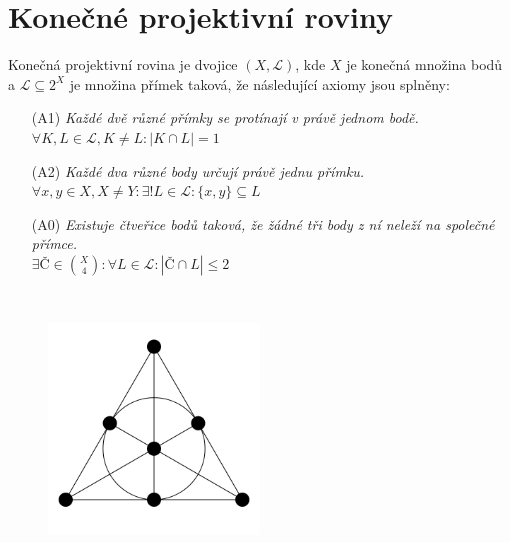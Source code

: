 \section{Konečné projektivní roviny}
\begin{t_definition}
  Konečná projektivní rovina je dvojice $(X, \mathcal{L})$, kde $X$ je konečná množina bodů a $\mathcal{L}\subseteq 2^X$ je množina přímek taková, že následující axiomy jsou splněny:
  \begin{enumerate}
    \item[(A1)]
    \textit{Každé dvě různé přímky se protínají v právě jednom bodě.}
    \\$\forall K,L\in\mathcal{L},K\neq L : |K\cap L|=1$
    \item[(A2)]
    \textit{Každé dva různé body určují právě jednu přímku.}
    \\$\forall x,y\in X,X\neq Y : \exists! L\in\mathcal{L} : \{x, y\}\subseteq L$
    \item[(A0)]
    \textit{Existuje čtveřice bodů taková, že žádné tři body z ní neleží na společné přímce.}
    \\$\exists Č\in\binom{X}{4}:\forall L\in\mathcal{L}:|Č\cap L|\leq 2$
  \end{enumerate}
\end{t_definition}

\begin{t_example}$ $
  \begin{figure}[!htbp]
    \centering
    \includegraphics[width=0.5\textwidth]{img/fano_plane.png}
  \end{figure}
\end{t_example}

